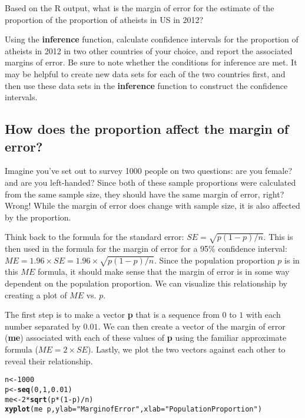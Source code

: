 \documentclass{article}\usepackage[]{graphicx}\usepackage[]{color}
\makeatletter
\newcommand{\hlnum}[1]{\textcolor[rgb]{0.686,0.059,0.569}{#1}}%
\newcommand{\hlstr}[1]{\textcolor[rgb]{0.192,0.494,0.8}{#1}}%
\newcommand{\hlopt}[1]{\textcolor[rgb]{0,0,0}{#1}}%
\newcommand{\hlstd}[1]{\textcolor[rgb]{0.345,0.345,0.345}{#1}}%
\newcommand{\hlkwb}[1]{\textcolor[rgb]{0.69,0.353,0.396}{#1}}%
\newcommand{\hlkwc}[1]{\textcolor[rgb]{0.333,0.667,0.333}{#1}}%
\newcommand{\hlkwd}[1]{\textcolor[rgb]{0.737,0.353,0.396}{\textbf{#1}}}%
\newenvironment{kframe}{%
 \def\at@end@of@kframe{}%
 \ifinner\ifhmode%
  \def\at@end@of@kframe{\end{minipage}}%
  \begin{minipage}{\columnwidth}%
 \fi\fi%
 \def\FrameCommand##1{\hskip\@totalleftmargin \hskip-\fboxsep
 \colorbox{shadecolor}{##1}\hskip-\fboxsep
     \hskip-\linewidth \hskip-\@totalleftmargin \hskip\columnwidth}%
 \MakeFramed {\advance\hsize-\width
   \@totalleftmargin\z@ \linewidth\hsize
   \@setminipage}}%
 {\par\unskip\endMakeFramed%
 \at@end@of@kframe}
\newenvironment{knitrout}{}{} %
\makeatother
\begin{document}
\begin{exercise}
Based on the R output, what is the margin of error for the estimate of the proportion of the proportion of atheists in US in 2012? 
\end{exercise}

\begin{exercise}
Using the \hlkwd{inference} function, calculate confidence intervals for the proportion of atheists in 2012 in two other countries of your choice, and report the associated margins of error. Be sure to note whether the conditions for inference are met. It may be helpful to create new data sets for each of the two countries first, and then use these data sets in the \hlkwd{inference} function to construct the confidence intervals.
\end{exercise}

\subsection*{How does the proportion affect the margin of error?}
Imagine you've set out to survey 1000 people on two questions: are you female? and are you left-handed? Since both of these sample proportions were calculated from the same sample size, they should have the same margin of error, right? Wrong!  While the margin of error does change with sample size, it is also affected by the proportion.

Think back to the formula for the standard error: $SE = \sqrt{p(1-p)/n}$. This is then used in the formula for the margin of error for a 95\% confidence interval: $ME = 1.96\times SE = 1.96\times\sqrt{p(1-p)/n}$. Since the population proportion $p$ is in this $ME$ formula, it should make sense that the margin of error is in some way dependent on the population proportion. We can visualize this relationship by creating a plot of $ME$ vs. $p$.

The first step is to make a vector \hlkwd{p} that is a sequence from $0$ to $1$ with each number separated by $0.01$. We can then create a vector of the margin of error (\hlkwd{me}) associated with each of these values of \hlkwd{p} using the familiar approximate formula ($ME = 2 \times SE$). Lastly, we plot the two vectors against each other to reveal their relationship.

\begin{knitrout}
\color{fgcolor}\begin{kframe}
\begin{alltt}
\hlstd{n} \hlkwb{<-} \hlnum{1000}
\hlstd{p} \hlkwb{<-} \hlkwd{seq}\hlstd{(}\hlnum{0}\hlstd{,} \hlnum{1}\hlstd{,} \hlnum{0.01}\hlstd{)}
\hlstd{me} \hlkwb{<-} \hlnum{2} \hlopt{*} \hlkwd{sqrt}\hlstd{(p} \hlopt{*} \hlstd{(}\hlnum{1} \hlopt{-} \hlstd{p)}\hlopt{/}\hlstd{n)}
\hlkwd{xyplot}\hlstd{(me} \hlopt{~} \hlstd{p,} \hlkwc{ylab} \hlstd{=} \hlstr{"Margin of Error"}\hlstd{,} \hlkwc{xlab} \hlstd{=} \hlstr{"Population Proportion"}\hlstd{)}
\end{alltt}
\end{kframe}
\end{knitrout}
\end{document}
